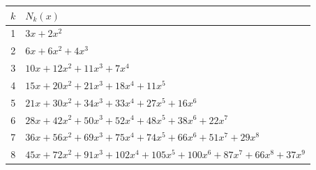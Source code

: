 \begin{tabular}{c l}
\toprule
$k$ & $N_k(x)$ \\
\midrule
1 & $3x + 2x^{2}$ \\
2 & $6x + 6x^{2} + 4x^{3}$ \\
3 & $10x + 12x^{2} + 11x^{3} + 7x^{4}$ \\
4 & $15x + 20x^{2} + 21x^{3} + 18x^{4} + 11x^{5}$ \\
5 & $21x + 30x^{2} + 34x^{3} + 33x^{4} + 27x^{5} + 16x^{6}$ \\
6 & $28x + 42x^{2} + 50x^{3} + 52x^{4} + 48x^{5} + 38x^{6} + 22x^{7}$ \\
7 & $36x + 56x^{2} + 69x^{3} + 75x^{4} + 74x^{5} + 66x^{6} + 51x^{7} + 29x^{8}$ \\
8 & $45x + 72x^{2} + 91x^{3} + 102x^{4} + 105x^{5} + 100x^{6} + 87x^{7} + 66x^{8} + 37x^{9}$ \\
\bottomrule
\end{tabular}
